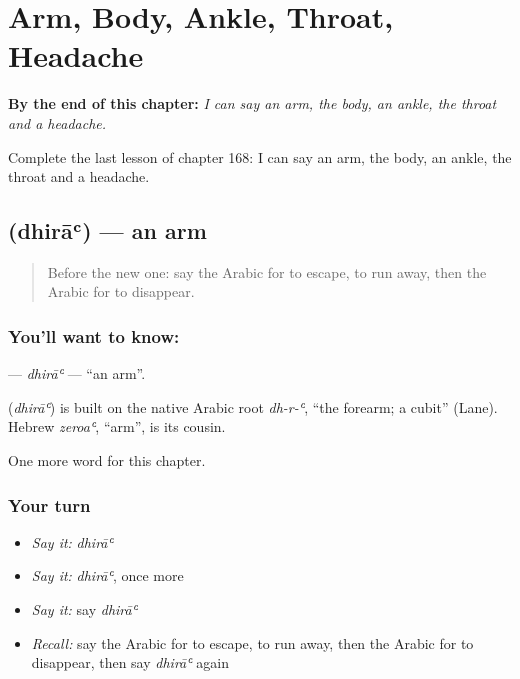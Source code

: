 
\chapter{Arm, Body, Ankle, Throat, Headache}
\label{ch:ar-arm-body-ankle-throat-headache}

\begin{chapteropening}
\textbf{By the end of this chapter:} \emph{I can say an arm, the body, an ankle, the throat and a headache.}

Complete the last lesson of chapter 168: I can say an arm, the body, an ankle, the throat and a headache.
\end{chapteropening}

\section[\texorpdfstring{\ar{ذراع} (dhirāʿ)}{ذراع (dhirāʿ)}]{ (dhirāʿ) — an arm}

\label{lesson:AR-C168-dhira}



\begin{quote}
Before the new one: say the Arabic for to escape, to run away, then the Arabic for to disappear.
\end{quote}

\subsection*{You'll want to know: }
\textbf{} — \emph{dhirāʿ} — \textquotedblleft{}an arm\textquotedblright{}.

\begin{cousinweb}
\textbf{} (\emph{dhirāʿ}) is built on the native Arabic root \emph{dh-r-ʿ}, \textquotedblleft{}the forearm; a cubit\textquotedblright{} (Lane). Hebrew \emph{zeroaʿ}, \textquotedblleft{}arm\textquotedblright{}, is its cousin.
\end{cousinweb}

\begin{grammarlens}[title={What you've built}]
One more word for this chapter.
\end{grammarlens}

\subsection*{Your turn}
\begin{itemize}
\raggedright
  \item \emph{Say it:} \emph{dhirāʿ}
  \item \emph{Say it:} \emph{dhirāʿ}, once more
  \item \emph{Say it:} say \emph{dhirāʿ}
  \item \emph{Recall:} say the Arabic for to escape, to run away, then the Arabic for to disappear, then say \emph{dhirāʿ} again
\end{itemize}

